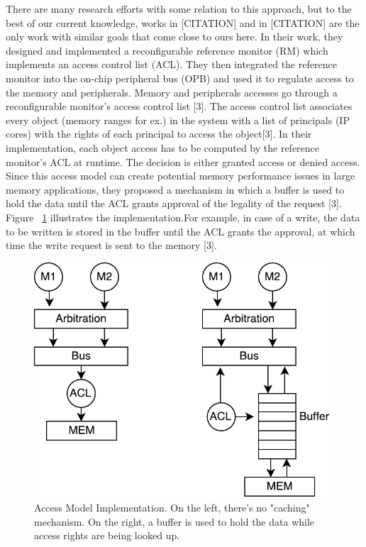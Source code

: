 \documentclass[sigconf]{acmart}
\theoremstyle{plain}
\theoremstyle{remark}
\begin{document}
There are many research efforts with some relation to this approach, but to the best of our current knowledge, works in [CITATION] and in [CITATION] are the only work with similar goals that come close to ours here. In their work, they designed and implemented a reconfigurable reference monitor (RM) which implements an access control list (ACL). They then integrated the reference monitor into the on-chip peripheral bus (OPB) and used it to regulate access to the memory and peripherals. Memory and peripherals accesses go through a reconfigurable monitor's access control list [3]. The access control list associates every object (memory ranges for ex.) in the system with a list of principals (IP cores) with the rights of each principal to access the object[3]. In their implementation, each object access has to be computed by the reference monitor's ACL at runtime. The decision is either granted access or denied access. Since this access model can create potential memory performance issues in large memory applications, they proposed a mechanism in which a buffer is used to hold the data until the ACL grants approval of the legality of the request [3]. Figure ~\ref{fig:ted} illustrates the implementation.For example, in case of a write, the data to be written is stored in the buffer until the ACL grants the approval, at which time the write request is sent to the memory [3].


\begin{figure}[hbt]
\centering
\includegraphics[width=0.75\columnwidth]{figures/ted_access.pdf}
\caption{Access Model Implementation. On the left, there's no "caching" mechanism. On the right, a buffer is used to hold the data while access rights are being looked up.} %
\label{fig:ted}
\end{figure}
\end{document}
